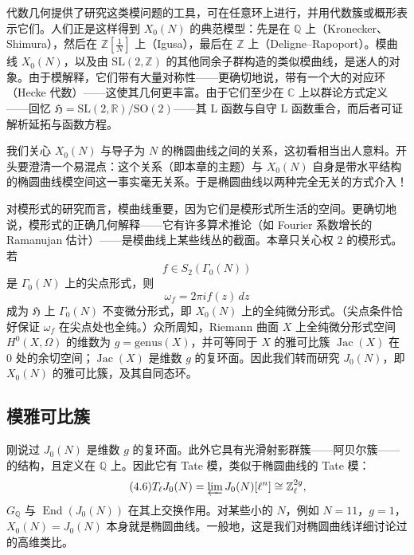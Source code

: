 代数几何提供了研究这类模问题的工具，可在任意环上进行，并用代数簇或概形表示它们。人们正是这样得到 $X_0(N)$ 的典范模型：先是在 $\mathbb{Q}$ 上（Kronecker、Shimura），然后在 $\mathbb{Z}[\frac1N]$ 上（Igusa），最后在 $\mathbb{Z}$ 上（Deligne--Rapoport）。模曲线 $X_0(N)$，以及由 $\mathrm{SL}(2,\mathbb{Z})$ 的其他同余子群构造的类似模曲线，是迷人的对象。由于模解释，它们带有大量对称性——更确切地说，带有一个大的对应环（Hecke 代数）——这使其几何更丰富。由于它们至少在 $\mathbb{C}$ 上以群论方式定义——回忆 $\mathfrak{H}=\mathrm{SL}(2,\mathbb{R})/\mathrm{SO}(2)$——其 L 函数与自守 L 函数重合，而后者可证解析延拓与函数方程。

我们关心 $X_0(N)$ 与导子为 $N$ 的椭圆曲线之间的关系，这初看相当出人意料。开头要澄清一个易混点：这个关系（即本章的主题）与 $X_0(N)$ 自身是带水平结构的椭圆曲线模空间这一事实毫无关系。于是椭圆曲线以两种完全无关的方式介入！

对模形式的研究而言，模曲线重要，因为它们是模形式所生活的空间。更确切地说，模形式的正确几何解释——它有许多算术推论（如 Fourier 系数增长的 Ramanujan 估计）——是模曲线上某些线丛的截面。本章只关心权 $2$ 的模形式。若
\begin{equation}\tag{4.4}\label{c5:eq:4.4}
f\in S_2(\Gamma_0(N))
\end{equation}
是 $\Gamma_0(N)$ 上的尖点形式，则
\begin{equation}\tag{4.5}\label{c5:eq:4.5}
\omega_f=2\pi if(z)\,dz
\end{equation}
成为 $\mathfrak{H}$ 上 $\Gamma_0(N)$ 不变微分形式，即 $X_0(N)$ 上的全纯微分形式。（尖点条件恰好保证 $\omega_f$ 在尖点处也全纯。）众所周知，Riemann 曲面 $X$ 上全纯微分形式空间 $H^0(X,\Omega)$ 的维数为 $g=\mathrm{genus}(X)$，并可等同于 $X$ 的雅可比簇 $\operatorname{Jac}(X)$ 在 $0$ 处的余切空间；$\operatorname{Jac}(X)$ 是维数 $g$ 的复环面。因此我们转而研究 $J_0(N)$，即 $X_0(N)$ 的雅可比簇，及其自同态环。

\subsection{模雅可比簇}\label{c5:sec:4.2}

刚说过 $J_0(N)$ 是维数 $g$ 的复环面。此外它具有光滑射影群簇——阿贝尔簇——的结构，且定义在 $\mathbb{Q}$ 上。因此它有 Tate 模，类似于椭圆曲线的 Tate 模：
\begin{equation}\tag{4.6}\label{c5:eq:4.6}
T_\ell J_0(N)=\varprojlim J_0(N)[\ell^n]\cong\mathbb{Z}_\ell^{2g},
\end{equation}
$G_{\mathbb{Q}}$ 与 $\operatorname{End}(J_0(N))$ 在其上交换作用。对某些小的 $N$，例如 $N=11$，$g=1$，$X_0(N)=J_0(N)$ 本身就是椭圆曲线。一般地，这是我们对椭圆曲线详细讨论过的高维类比。

